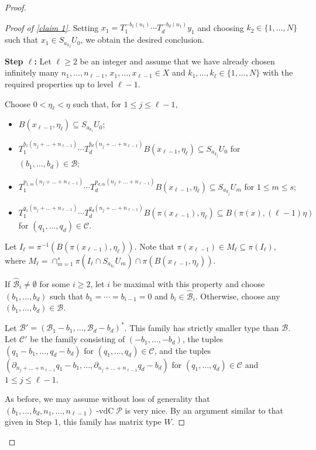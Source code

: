 \documentclass[11pt,reqno]{amsart}
\newcommand{\cB}{{\mathcal B}}
\newcommand{\cC}{{\mathcal C}}
\newcommand{\cP}{{\mathcal P}}
\DeclareMathOperator{\vdc}{-vdC}
\theoremstyle{definition}
\theoremstyle{remark}
\begin{document}
\begin{proof}
\begin{proof}[Proof of \cref{claim 1}]
    Setting $x_1 = T_1^{-b_1(n_1)}\cdots T_d^{-b_d(n_1)}y_1$ and choosing $k_2\in \{1,\dots,N\}$ such that $x_1\in S_{a_{k_2}}U_0$, we obtain the desired conclusion.

    \textbf{Step $\ell$:} Let $\ell\geq 2$ be an integer and assume that we have already chosen  infinitely many $n_1,\dots,n_{\ell-1}$, $x_1,\dots,x_{\ell-1}\in X$ and $k_1,\dots,k_{\ell}\in \{1,\dots,N\}$ with the required properties up to level $\ell-1$.

    Choose $0<\eta_\ell<\eta$ such that, for $1\leq j \leq \ell-1$,\begin{itemize}
        \item $B(x_{\ell-1},\eta_{\ell})\subseteq S_{a_{k_\ell}}U_0$;
        \item $T_1^{b_1(n_j+\dots+n_{\ell-1})}\cdots T_d^{b_d(n_j+\dots+n_{\ell-1})}B(x_{\ell-1},\eta_\ell)\subseteq S_{a_{k_j}}U_0$ for $(b_1,\dots,b_d)\in \cB$;
        \item $T_1^{p_{1,m}(n_j+\dots+n_{\ell-1})}\cdots T_d^{p_{d,m}(n_j+\dots+n_{\ell-1})}B(x_{\ell-1},\eta_\ell)\subseteq S_{a_{k_j}}U_m$ for $1\leq m \leq s$;
        \item $T_1^{q_1(n_j+\dots+n_{\ell-1})}\cdots T_d^{q_d(n_j+\dots+n_{\ell-1})}B(\pi(x_{\ell-1}),\eta_\ell)\subseteq B(\pi(x),(\ell-1)\eta)$ for $(q_1,\dots,q_d)\in \cC$.
    \end{itemize}

    Let $I_{\ell} = \pi^{-1}(B(\pi(x_{\ell-1}),\eta_\ell))$. Note that $\pi(x_{\ell-1})\in M_{\ell}\subseteq \pi(I_\ell)$, where $M_{\ell} = \cap_{m=1}^{s} \pi(I_\ell \cap S_{a_{k_\ell}}U_m) \cap \pi(B(x_{\ell-1},\eta_{\ell}))$.

    If $\widehat{\cB}_i\neq\emptyset$ for some $i\geq 2$, let $i$ be maximal with this property and choose $(b_1,\dots,b_d)$ such that $b_1=\cdots=b_{i-1}=0$ and $b_i\in \widehat{\cB}_i$. Otherwise, choose any $(b_1,\dots,b_d)\in \cB$.
    
    Let $\cB' = (\cB_1 -b_1,\dots,\cB_d-b_d)^*$. This family has strictly smaller type than $\cB$. Let $\cC'$ be the family consisting of $(-b_1,\dots,-b_d)$, the tuples $(q_1-b_1,\dots,q_d-b_d)$ for $(q_1,\dots,q_d)\in \cC$, and the tuples $(\partial_{n_j+\dots+n_{\ell-1}}q_1-b_1,\dots,\partial_{n_j+\dots+n_{\ell-1}}q_d-b_d)$ for $(q_1,\dots,q_d)\in \cC$ and $1\leq j \leq \ell-1$. 

    As before, we may assume without loss of generality that $(b_1,\dots,b_d,n_1,\dots,n_{\ell-1})\vdc\cP$ is very nice. By an argument similar to that given in Step $1$, this family has matrix type $W$.
    

\end{proof}
\end{proof}
\end{document}
